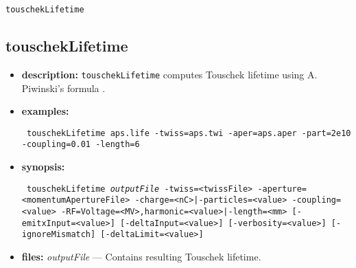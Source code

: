 \documentclass[11pt]{article}
\begin{document}
\begin{latexonly}
\newpage
\begin{center}{\Large\verb|touschekLifetime|}\end{center}
\end{latexonly}
\subsection{touschekLifetime}

\begin{itemize}

\item {\bf description:} \verb|touschekLifetime| computes Touschek lifetime using 
A. Piwinski's formula \cite{Piwinski, Xiao2007a}.

\item {\bf examples:}
\begin{flushleft}{\tt
touschekLifetime aps.life -twiss=aps.twi -aper=aps.aper -part=2e10 -coupling=0.01 -length=6
}\end{flushleft}

\item {\bf synopsis:}
\begin{flushleft}{\tt 
touschekLifetime {\em outputFile}
 -twiss=<twissFile> -aperture=<momentumApertureFile>
 {-charge=<nC>|-particles=<value>} -coupling=<value>
 {-RF=Voltage=<MV>,harmonic=<value>|-length=<mm>} 
 [-emitxInput=<value>] [-deltaInput=<value>] [-verbosity=<value>]
 [-ignoreMismatch] [-deltaLimit=<value>]
}\end{flushleft}

\item {\bf files:}
{\em outputFile} --- Contains resulting Touschek lifetime.


\end{itemize}
\end{document}
